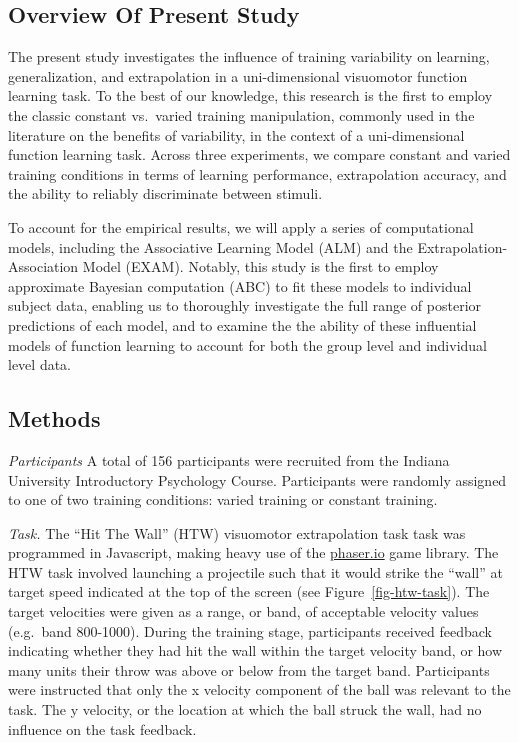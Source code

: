 \documentclass[
  12pt,
  letterpaper,
]{article}
\begin{document}
\subsection{Overview Of Present Study}\label{overview-of-present-study}

The present study investigates the influence of training variability on
learning, generalization, and extrapolation in a uni-dimensional
visuomotor function learning task. To the best of our knowledge, this
research is the first to employ the classic constant vs.~varied training
manipulation, commonly used in the literature on the benefits of
variability, in the context of a uni-dimensional function learning task.
Across three experiments, we compare constant and varied training
conditions in terms of learning performance, extrapolation accuracy, and
the ability to reliably discriminate between stimuli.

To account for the empirical results, we will apply a series of
computational models, including the Associative Learning Model (ALM) and
the Extrapolation-Association Model (EXAM). Notably, this study is the
first to employ approximate Bayesian computation (ABC) to fit these
models to individual subject data, enabling us to thoroughly investigate
the full range of posterior predictions of each model, and to examine
the the ability of these influential models of function learning to
account for both the group level and individual level data.

\subsection{Methods}\label{methods-2}

\emph{Participants} A total of 156 participants were recruited from the
Indiana University Introductory Psychology Course. Participants were
randomly assigned to one of two training conditions: varied training or
constant training.

\emph{Task.} The ``Hit The Wall'' (HTW) visuomotor extrapolation task
task was programmed in Javascript, making heavy use of the
\href{https://phaser.io/}{phaser.io} game library. The HTW task involved
launching a projectile such that it would strike the ``wall'' at target
speed indicated at the top of the screen (see
Figure~\ref{fig-htw-task}). The target velocities were given as a range,
or band, of acceptable velocity values (e.g.~band 800-1000). During the
training stage, participants received feedback indicating whether they
had hit the wall within the target velocity band, or how many units
their throw was above or below from the target band. Participants were
instructed that only the x velocity component of the ball was relevant
to the task. The y velocity, or the location at which the ball struck
the wall, had no influence on the task feedback.
\end{document}
